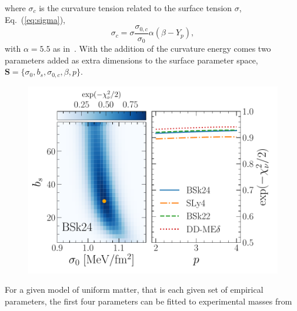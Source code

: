 %
where $\sigma_c$ is the curvature tension related to the surface tension
$\sigma$, Eq.~(\ref{eq:sigma}),
%
\begin{equation}
  \sigma_c =
  \sigma\frac{\sigma_{0,c}}{\sigma_0}\alpha(\beta-Y_p),\label{eq:sigmac}
\end{equation}
%
with $\alpha = 5.5$ as in~\cite{Newton2012}. With the addition of the
curvature energy comes two parameters added as extra dimensions to 
the surface parameter space, $\bm{S} = \{\sigma_0, b_s, \sigma_{0,c}, \beta,
p\}$.
%
\begin{figure}[!t]
\begin{center}
  \includegraphics[width=0.9\linewidth]{figures/surf_fit.pdf}
\end{center}
\caption[]{}\label{fig:surf_fit}
\end{figure}
%
For a given model of uniform matter, that is each given set of empirical
parameters, the first four parameters can be fitted to experimental masses from 
